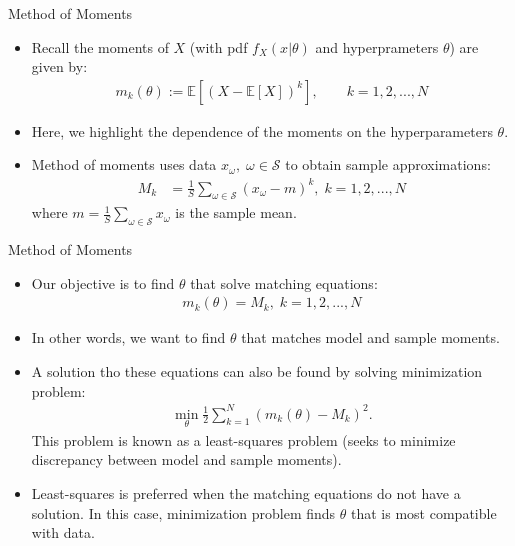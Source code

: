 \documentclass[handout,9pt]{beamer}
\begin{document}
\begin{frame}{Method of Moments}

\begin{itemize}
\setlength{\itemsep}{5pt}
\item Recall the moments of $X$ (with pdf $f_X(x|\theta)$ and hyperprameters $\theta$) are given by:
\begin{align*}
m_k(\theta):=\mathbb{E}[(X-\mathbb{E}[X])^k], \qquad k=1,2,...,N
\end{align*}
\item Here, we highlight the dependence of the moments on the hyperparameters $\theta$. 

\item Method of moments uses data $x_\omega,\; \omega \in \mathcal{S}$ to obtain sample approximations: 
\begin{align*}
M_k&=\frac{1}{S}\sum_{\omega\in \mathcal{S}}(x_\omega-m)^k, \; k=1,2,...,N
\end{align*}
where $m=\frac{1}{S}\sum_{\omega\in \mathcal{S}}x_\omega$ is the sample mean.

\end{itemize}

\end{frame}


\begin{frame}{Method of Moments}

\begin{itemize}
\setlength{\itemsep}{5pt}
\item Our objective is to find $\theta$ that solve matching equations:
\begin{align*}
m_k(\theta)=M_k,\; k=1,2,...,N
\end{align*}
\item In other words, we want to find $\theta$ that matches model and sample moments. 

\item A solution tho these equations can also be found by solving minimization problem:
\begin{align*}
\min_\theta \frac{1}{2}\sum_{k=1}^N(m_k(\theta)-M_k)^2.
\end{align*}
This problem is known as a least-squares problem (seeks to minimize discrepancy between model and sample moments). 

\item Least-squares is preferred when the matching equations do not have a solution. In this case, minimization problem finds $\theta$ that is most compatible with data.  

\end{itemize}

\end{frame}
\end{document}
